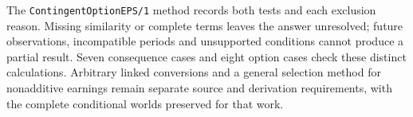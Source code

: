 The \texttt{ContingentOptionEPS/1} method records both tests and each exclusion
reason. Missing similarity or complete terms leaves the answer unresolved;
future observations, incompatible periods and unsupported conditions cannot
produce a partial result. Seven consequence cases and eight option cases check
these distinct calculations. Arbitrary linked conversions and a general
selection method for nonadditive earnings remain separate source and derivation
requirements, with the complete conditional worlds preserved for that work.
